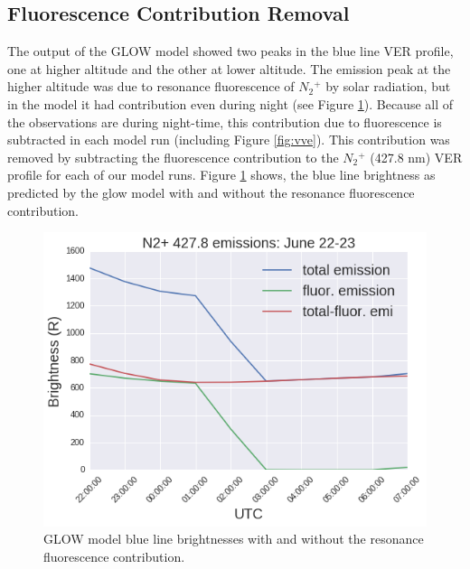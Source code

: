 \documentclass[crop=false,class=mitthesis,oneside,font=12pt]{standalone}
\begin{document}
\subsection{Fluorescence Contribution Removal}
The output of the GLOW model showed two peaks in the blue line VER profile, one at higher altitude and the other at lower altitude. The emission peak at the higher altitude was due to resonance fluorescence of $N{_2}{^+}$ by solar radiation, but in the model it had contribution even during night (see Figure \ref{fig:fl_rmv}). Because all of the observations are during night-time, this contribution due to fluorescence is subtracted in each model run (including Figure \ref{fig:vve}). This contribution was removed by subtracting the fluorescence contribution to the $N{_2}{^+}$ (427.8 nm) VER profile for each of our model runs. Figure \ref{fig:fl_rmv} shows, the blue line brightness as predicted by the glow model with and without the resonance fluorescence contribution.
\begin{figure}[H]
	\centering\includegraphics[width=35pc]{flu_cont_rmv.png}
	\caption{GLOW model blue line brightnesses with and without the resonance fluorescence contribution.}
	\label{fig:fl_rmv}
\end{figure}

\end{document}
